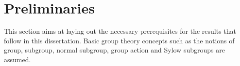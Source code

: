 \chapter{Preliminaries}

This section aims at laying out the necessary prerequisites for the results that follow in this dissertation.
Basic group theory concepts such as the notions of group, subgroup, normal subgroup, group action and Sylow subgroups are assumed.



















